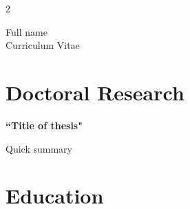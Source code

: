 \documentclass[10pt]{article} %
\begin{document}
\begin{paracol}{2} %


\parbox[top][0.12\textheight][c]{\linewidth}{ %
	\vspace{-0.04\textheight} %
	\centering %
	{\sffamily\Huge Full name}\\\medskip %
	{\Huge\color{headings}\cvtextfont Curriculum Vitae}
}


\section{Doctoral Research}

{\raggedright\textbf{``Title of thesis"}\\\medskip}

Quick summary

\medskip %



\section{Education} 






\end{paracol}
\end{document}
